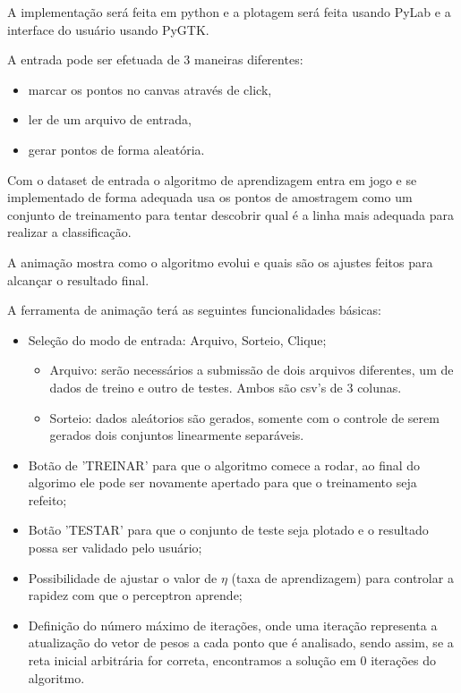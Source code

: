 \documentclass[brazil, a4paper]{article}
\begin{document}
A implementação será feita em python e a plotagem será feita usando PyLab e a interface do usuário usando PyGTK.

A entrada pode ser efetuada de 3 maneiras diferentes:
\begin{itemize}
\item marcar os pontos no canvas através de click,
\item ler de um arquivo de entrada, 
\item gerar pontos de forma aleatória.
\end{itemize}

Com o dataset de entrada o algoritmo de aprendizagem entra em jogo e se implementado de forma adequada usa os pontos de amostragem como um conjunto de treinamento para tentar descobrir qual é a linha mais adequada para realizar a classificação. 

A animação mostra como o algoritmo evolui e quais são os ajustes feitos para alcançar o resultado final.

A ferramenta de animação terá as seguintes funcionalidades básicas:
\begin{itemize} 
\item Seleção do modo de entrada: Arquivo, Sorteio, Clique;
\begin{itemize}
\item Arquivo: serão necessários a submissão de dois arquivos diferentes, um de dados de treino e outro de testes. Ambos são csv's de 3 colunas. 
\item Sorteio: dados aleátorios são gerados, somente com o controle de serem gerados dois conjuntos linearmente separáveis.

\end{itemize}
\item Botão de 'TREINAR' para que o algoritmo comece a rodar, ao final do algorimo ele pode ser novamente apertado para que o treinamento seja refeito;
\item Botão 'TESTAR' para que o conjunto de teste seja plotado e o resultado possa ser validado pelo usuário;
\item Possibilidade de  ajustar o valor de $\eta$ (taxa de aprendizagem) para controlar a rapidez com que o perceptron aprende;
\item Definição do número máximo de iterações, onde uma iteração representa a atualização do vetor de pesos a cada ponto que é analisado, sendo assim, se a reta inicial arbitrária for correta, encontramos a solução em 0 iterações do algoritmo.
\end{itemize}
\end{document}
